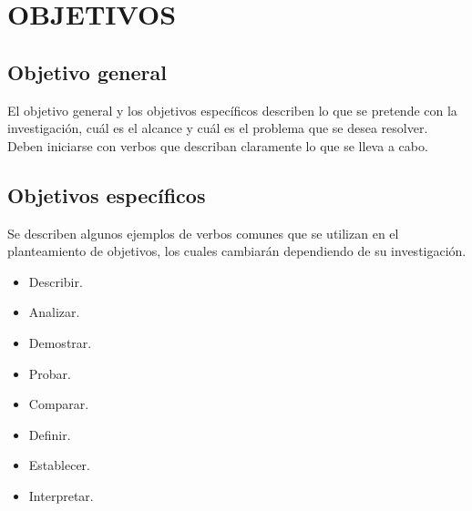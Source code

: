 \section{OBJETIVOS}


\subsection{Objetivo general}
El objetivo general y los objetivos específicos describen lo que se pretende con la investigación, cuál es el alcance y cuál es el problema que se desea resolver. Deben iniciarse con verbos que describan claramente lo que se lleva a cabo.


\subsection{Objetivos específicos}
Se describen algunos ejemplos de verbos comunes que se utilizan en el planteamiento de objetivos, los cuales cambiarán dependiendo de su investigación.

\begin{itemize}
    \item Describir.
    \item Analizar.
    \item Demostrar.
    \item Probar.
    \item Comparar.
    \item Definir.
    \item Establecer.
    \item Interpretar.
\end{itemize}